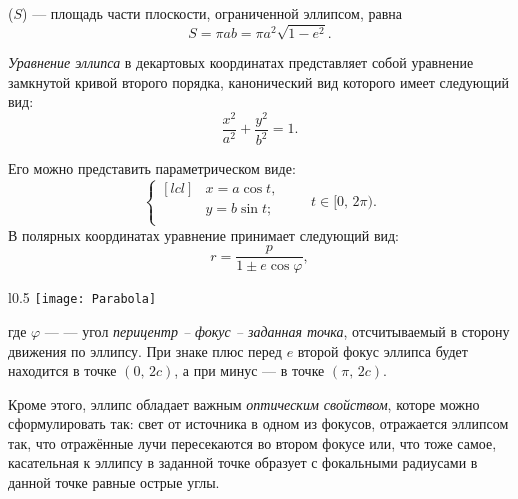  ($S$) --- площадь части 
плоскости, ограниченной эллипсом, равна
\begin{equation}
S=\pi ab = \pi a^2 \sqrt{1-e^2}.
\end{equation}


{\itshape Уравнение эллипса} в декартовых координатах 
представляет собой уравнение замкнутой кривой второго 
порядка, канонический вид которого имеет следующий вид:
\begin{equation}
\frac{x^2}{a^2}+\frac{y^2}{b^2}=1.
\end{equation}

Его можно представить параметрическом виде:\begin{equation}
\left\{\begin{aligned}[lcl]
&x=a\cos t,\\
&y=b\sin t;\\
\end{aligned}
\right. \quad\quad t \in [0, \, 2\pi).
\end{equation}
В полярных координатах уравнение принимает следующий вид:
\begin{equation}
r=\frac{p}{1\pm e \cos \varphi},
\label{eq:ellipse-pol-eq}
\end{equation} 
\begin{wrapfigure}[11]{l}{0.5\tw}
	\centering
	\vspace{-.7pc}
	\texttt{[image: Parabola]}
\end{wrapfigure}
где $\varphi$ ---  --- угол 
{\slshape перицентр -- фокус -- заданная точка}, 
отсчитываемый в сторону движения по эллипсу. При 
знаке плюс перед $e$ второй фокус эллипса будет 
находится в точке $(0, \, 2c)$, а при минус --- в 
точке $(\pi, \, 2c)$.

Кроме этого, эллипс обладает важным {\itshape оптическим 
свойством}, которе можно сформулировать так: свет от источника в одном из фокусов, 
	отражается эллипсом так, что отражённые лучи пересекаются 
	во втором фокусе или, что тоже самое, касательная к эллипсу в заданной точке образует с фокальными радиусами в данной точке равные острые углы.






 

